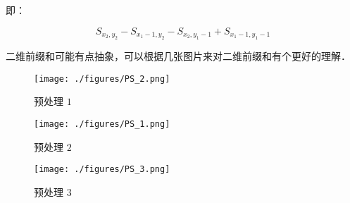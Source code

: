 即：

\begin{equation}
S_{x_2, y_2} - S_{x_1 - 1, y_2} - S_{x_2, y_1 - 1} + S_{x_1 - 1, y_1 - 1}
\end{equation}

二维前缀和可能有点抽象，可以根据几张图片来对二维前缀和有个更好的理解．

\begin{figure}[ht]
\centering
\texttt{[image: ./figures/PS\_2.png]}
\caption{预处理 $1$} \label{PS_fig2}
\end{figure}


\begin{figure}[ht]
\centering
\texttt{[image: ./figures/PS\_1.png]}
\caption{预处理 $2$ } \label{PS_fig1}
\end{figure}

\begin{figure}[ht]
\centering
\texttt{[image: ./figures/PS\_3.png]}
\caption{预处理 $3$} \label{PS_fig3}
\end{figure}

